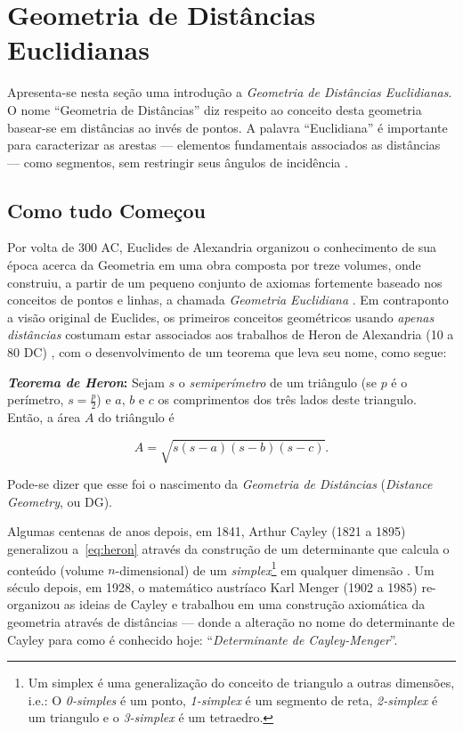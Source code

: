 \section{Geometria de Distâncias Euclidianas\label{sec:GD}}
Apresenta-se nesta seção uma introdução a \textit{Geometria de Distâncias Euclidianas}. O nome ``Geometria de Distâncias'' diz respeito ao conceito desta geometria basear-se em distâncias ao invés de pontos. A palavra ``Euclidiana'' é importante para caracterizar as arestas --- elementos fundamentais associados as distâncias --- como segmentos, sem restringir seus ângulos de incidência \cite{libertiEDG}.

\subsection{Como tudo Começou}

Por volta de 300 AC, Euclides de Alexandria organizou o conhecimento de sua época acerca da Geometria em uma obra composta por treze volumes, onde construiu, a partir de um pequeno conjunto de axiomas fortemente baseado nos conceitos de pontos e linhas, a chamada \textit{Geometria Euclidiana} \cite{elementosEuclides}. Em contraponto a visão original de Euclides, os primeiros conceitos geométricos usando \textit{apenas distâncias} costumam estar associados aos trabalhos de Heron de Alexandria (10 a 80 DC) \cite{libertiEDG}, com o desenvolvimento de um teorema que leva seu nome, como segue: 
\begin{center}
	\begin{minipage}{0.9 \linewidth}
		\textbf{\textit{Teorema de Heron}:} Sejam $s$ o \textit{semiperímetro} de um triângulo (se $p$ é o perímetro, $s = \frac{p}{2}$) e $a$, $b$ e $c$ os comprimentos dos três lados deste triangulo. Então, a área $A$ do triângulo é
		
		\begin{equation}\tag{Fórmula de Heron}
		A = \sqrt{s(s-a)(s-b)(s-c)}.
		\label{eq:heron}
		\end{equation}
	\end{minipage}
\end{center} 
Pode-se dizer que esse foi o nascimento da \textit{Geometria de Distâncias} (\textit{Distance Geometry}, ou DG).

Algumas centenas de anos depois, em 1841, Arthur Cayley (1821 a 1895) generalizou a~\ref{eq:heron} através da construção de um determinante que calcula o conteúdo (volume $n$-dimensional) de um \textit{simplex}\footnote{Um simplex é uma generalização do conceito de triangulo a outras dimensões, i.e.: O \textit{0-simples} é um ponto, \textit{1-simplex} é um segmento de reta, \textit{2-simplex} é um triangulo e o \textit{3-simplex} é um tetraedro.} em qualquer dimensão \cite{cayley1841HaronGD}. Um século depois, em 1928, o matemático austríaco Karl Menger (1902 a 1985) re-organizou as ideias de Cayley e trabalhou em uma construção axiomática da geometria através de distâncias \cite{mengerDeterminante} --- donde a alteração no nome do determinante de Cayley para como é conhecido hoje: ``\textit{Determinante de Cayley-Menger}''.  

